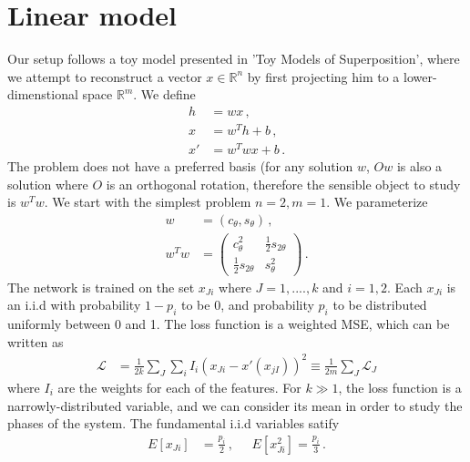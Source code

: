 \documentclass[a4paper]{article}
\begin{document}
\section{Linear model}
Our setup follows a toy model presented in 'Toy Models of Superposition', where we attempt to reconstruct a vector $x \in \mathbb{R}^n$ by first projecting him to a lower-dimenstional space $\mathbb{R}^m$. We define
\begin{align}
h &= w x \,,
\\
x &= w^T h + b\,,
\\
x' &=  w^T w x + b\,.
\end{align}
The problem does not have a preferred basis (for any solution $w$, $Ow$ is also a solution where $O$ is an orthogonal rotation, therefore the sensible object to study is $w^T w$.
We start with the simplest problem $n=2,m=1$. We parameterize
\begin{align}
w &= (c_\theta, s_\theta)\,,
\\
w^T w &= \begin{pmatrix}
c^2_\theta & \frac12 s_{2\theta} 
\\
\frac12 s_{2\theta} & s^2_\theta
\end{pmatrix}\,.
\end{align}
The network is trained on the set $x_{Ji}$ where $J=1,....,k$ and $i=1,2$. Each $x_{Ji}$ is an i.i.d with probability $1-p_i$ to be 0, and probability $p_i$ to be distributed uniformly between 0 and 1.  The loss function is a weighted MSE, which can be written as
\begin{align}
\mathcal{L} &= \frac{1}{2k} \sum_{J}\sum_{i} I_i (x_{Ji}-x'(x_{jI}))^2 \equiv   \frac{1}{2m} \sum_{J} \mathcal{L}_J
\end{align}
where $I_i $ are the weights for each of the features. For $k \gg 1$, the loss function is a narrowly-distributed variable, and we can consider its mean in order to study the phases of the system. The fundamental i.i.d variables satify
\begin{align}
E[x_{Ji}] &= \frac{p_i}{2}\,, \;\;\;\;\;
E[x^2_{Ji}] = \frac{p_i}{3}\,.
\end{align}
\end{document}
